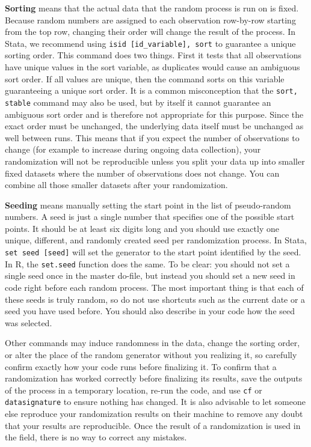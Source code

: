 \textbf{Sorting} means that the actual data that the random process is run on is fixed.
Because random numbers are assigned to each observation row-by-row starting from
the top row,
changing their order will change the result of the process.
In Stata, we recommend using \texttt{isid [id\_variable], sort}
to guarantee a unique sorting order.
This command does two things.
First it tests that all observations have unique values in the sort variable,
as duplicates would cause an ambiguous sort order.
If all values are unique,
then the command sorts on this variable guaranteeing a unique sort order.
It is a common misconception that the \texttt{sort, stable} command
may also be used,
but by itself it cannot guarantee an ambiguous sort order
and is therefore not appropriate for this purpose.
Since the exact order must be unchanged,
the underlying data itself must be unchanged as well between runs.
This means that if you expect the number of observations to change
(for example to increase during ongoing data collection),
your randomization will not be reproducible unless you split your data up into
smaller fixed datasets where the number of observations does not change.
You can combine all
those smaller datasets after your randomization.


\textbf{Seeding} means manually setting the start point in the list of pseudo-random numbers.
A seed is just a single number that specifies one of the possible start points.
It should be at least six digits long and you should use exactly
one unique, different, and randomly created seed per randomization process.
In Stata, \texttt{set seed [seed]} will set the generator
to the start point identified by the seed.
In R, the \texttt{set.seed} function does the same.
To be clear: you should not set a single seed once in the master do-file,
but instead you should set a new seed in code right before each random process.
The most important thing is that each of these seeds is truly random,
so do not use shortcuts such as the current date or a seed you have used before.
You should also describe in your code how the seed was selected.

Other commands may induce randomness in the data,
change the sorting order,
or alter the place of the random generator without you realizing it,
so carefully confirm exactly how your code runs before finalizing it.
To confirm that a randomization has worked correctly before finalizing its results,
save the outputs of the process in a temporary location,
re-run the code, and use \texttt{cf} or \texttt{datasignature} to ensure
nothing has changed. It is also advisable to let someone else reproduce your
randomization results on their machine to remove any doubt that your results
are reproducible.
Once the result of a randomization is used in the field,
there is no way to correct any mistakes.

